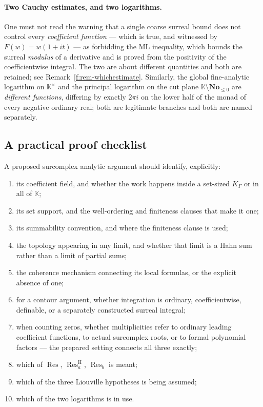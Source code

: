 \documentclass[11pt,a4paper]{article}
\numberwithin{equation}{section}
\theoremstyle{definition}
\theoremstyle{remark}
\theoremstyle{plain}
\newcommand{\K}{\mathbb K}
\newcommand{\No}{\mathbf{No}}
\DeclareMathOperator{\Res}{Res}                 %
\newcommand{\ResH}[1]{\Res^{\mathrm H}_{#1}}    %
\newcommand{\Resat}[1]{\Res_{#1}}               %
\begin{document}
\paragraph{Two Cauchy estimates, and two logarithms.}
One must not read the warning that a single coarse surreal bound does
not control every \emph{coefficient function} --- which is true, and
witnessed by $F(w)=w(1+it)$ --- as forbidding the $\mathrm{ML}$
inequality, which bounds the surreal \emph{modulus} of a derivative and
is proved from the positivity of the coefficientwise integral.  The two
are about different quantities and both are retained; see
Remark~\ref{f:rem-whichestimate}.  Similarly, the global fine-analytic
logarithm on $\K^{\times}$ and the principal logarithm on the cut plane
$\K\setminus\No_{\le0}$ are \emph{different functions}, differing by
exactly $2\pi i$ on the lower half of the monad of every negative ordinary real;
both are legitimate branches and both are named separately.

\subsection{A practical proof checklist}\label{f:sub-checklist}

A proposed surcomplex analytic argument should identify, explicitly:
\begin{enumerate}[label=\textup{(\arabic*)},leftmargin=2.6em]
\item its coefficient field, and whether the work happens inside a
 set-sized $K_{\Gamma}$ or in all of $\K$;
\item its set support, and the well-ordering and finiteness clauses that
 make it one;
\item its summability convention, and where the finiteness clause is
 used;
\item the topology appearing in any limit, and whether that limit is a
 Hahn sum rather than a limit of partial sums;
\item the coherence mechanism connecting its local formulas, or the
 explicit absence of one;
\item for a contour argument, whether integration is ordinary,
 coefficientwise, definable, or a separately constructed surreal
 integral;
\item when counting zeros, whether multiplicities refer to ordinary
 leading coefficient functions, to actual surcomplex roots, or to
 formal polynomial factors --- the prepared setting connects all three
 exactly;
\item which of $\Res$, $\ResH a$, $\Resat b$ is meant;
\item which of the three Liouville hypotheses is being assumed;
\item which of the two logarithms is in use.
\end{enumerate}
\end{document}

